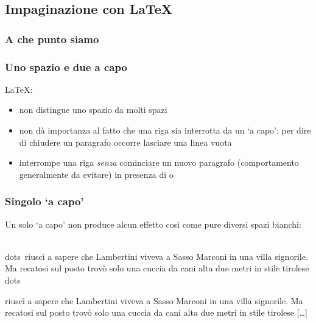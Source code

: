 \documentclass[svgnames,%
	ucs,%
	pdftex]{guitbeamer}
\begin{document}
\subsection{Impaginazione con \LaTeX}
\begin{frame}
  \frametitle{A che punto siamo}
\end{frame}
\begin{frame}
  \frametitle{Uno spazio e due a capo}
	\LaTeX:
	\begin{itemize}
		\item non distingue uno spazio da molti spazi
		\item non d\`a importanza al fatto che una riga sia interrotta da un `a capo': per dire di chiudere un paragrafo occorre lasciare una linea vuota %
		\item interrompe una riga \emph{senza} cominciare un nuovo paragrafo (comportamento generalmente da evitare) in presenza di  o \LCmd{\bs}
	\end{itemize}
\end{frame}
\begin{frame}
  \frametitle{Singolo `a capo'}
	Un solo `a capo' non produce alcun effetto cos\`i come pure
	diversi spazi bianchi:
	\begin{LaTeXcode}
		\tls\\dots\trs\ riusc\`i a sapere che \qquad Lambertini viveva a
		Sasso Marconi in una villa signorile.\n
		Ma recatosi sul posto trov\`o solo una cuccia da cani
		alta due metri in stile tirolese \tls\\dots\trs
	\end{LaTeXcode}
	\begin{LaTeXoutput}[]
		[\dots] riusc\`i a sapere che Lambertini viveva a Sasso
		Marconi in una villa signorile. Ma recatosi sul posto
		trov\`o solo una cuccia da cani alta due metri in stile
		tirolese [\dots]
	\end{LaTeXoutput}
\end{frame}
\end{document}
